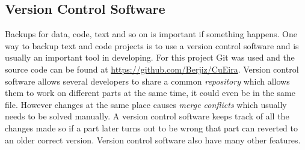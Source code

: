\documentclass[10pt,a4paper]{report}
\begin{document}
\subsection{Version Control Software}
Backups for data, code, text and so on is important if something happens. One way to backup text and code projects is to use a version control software and is usually an important tool in developing\cite{git_book}. For this project Git was used and the source code can be found at \url{https://github.com/Berjiz/CuEira}. Version control software allows several developers to share a common \emph{repository} which allows them to work on different parts at the same time, it could even be in the same file\cite{git_book}. However changes at the same place causes \emph{merge conflicts} which usually needs to be solved manually\cite{git_book}. A version control software keeps track of all the changes made so if a part later turns out to be wrong that part can reverted to an older correct version\cite{git_book}. Version control software also have many other features\cite{git_book}.

\clearpage
\end{document}
